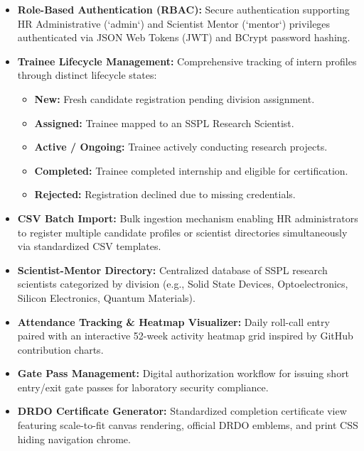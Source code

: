 \documentclass[12pt,a4paper]{article}
\begin{document}
\begin{itemize}[leftmargin=*]
    \item \textbf{Role-Based Authentication (RBAC):} Secure authentication supporting HR Administrative (`admin`) and Scientist Mentor (`mentor`) privileges authenticated via JSON Web Tokens (JWT) and BCrypt password hashing.
    
    \item \textbf{Trainee Lifecycle Management:} Comprehensive tracking of intern profiles through distinct lifecycle states:
    \begin{itemize}
        \item \textbf{New:} Fresh candidate registration pending division assignment.
        \item \textbf{Assigned:} Trainee mapped to an SSPL Research Scientist.
        \item \textbf{Active / Ongoing:} Trainee actively conducting research projects.
        \item \textbf{Completed:} Trainee completed internship and eligible for certification.
        \item \textbf{Rejected:} Registration declined due to missing credentials.
    \end{itemize}
    
    \item \textbf{CSV Batch Import:} Bulk ingestion mechanism enabling HR administrators to register multiple candidate profiles or scientist directories simultaneously via standardized CSV templates.
    
    \item \textbf{Scientist-Mentor Directory:} Centralized database of SSPL research scientists categorized by division (e.g., Solid State Devices, Optoelectronics, Silicon Electronics, Quantum Materials).
    
    \item \textbf{Attendance Tracking \& Heatmap Visualizer:} Daily roll-call entry paired with an interactive 52-week activity heatmap grid inspired by GitHub contribution charts.
    
    \item \textbf{Gate Pass Management:} Digital authorization workflow for issuing short entry/exit gate passes for laboratory security compliance.
    
    \item \textbf{DRDO Certificate Generator:} Standardized completion certificate view featuring scale-to-fit canvas rendering, official DRDO emblems, and print CSS hiding navigation chrome.
\end{itemize}
\end{document}
